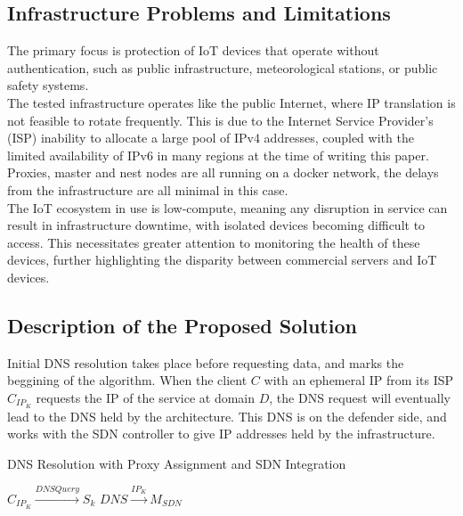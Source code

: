\documentclass[conference]{IEEEtran}
\begin{document}
\subsection{Infrastructure Problems and Limitations}
The primary focus is protection of IoT devices that operate without authentication, such as public infrastructure, meteorological stations, or public safety systems.
\\
The tested infrastructure operates like the public Internet, where IP translation is not feasible to rotate frequently. This is due to the Internet Service Provider's (ISP) inability to allocate a large pool of IPv4 addresses, coupled with the limited availability of IPv6 in many regions at the time of writing this paper. Proxies, master and nest nodes are all running on a docker network, the delays from the infrastructure are all minimal in this case.
\\
The IoT ecosystem in use is low-compute, meaning any disruption in service can result in infrastructure downtime, with isolated devices becoming difficult to access. This necessitates greater attention to monitoring the health of these devices, further highlighting the disparity between commercial servers and IoT devices.


\subsection{Description of the Proposed Solution}

Initial DNS resolution takes place before requesting data, and marks the beggining of the algorithm. When the client $C$ with an ephemeral IP from its ISP $C_{IP_K}$ requests the IP of the service at domain $D$, the DNS request will eventually lead to the DNS held by the architecture. This DNS is on the defender side, and works with the SDN controller to give IP addresses held by the infrastructure. \\

\begin{algorithm}
\caption{DNS Resolution with Proxy Assignment and SDN Integration}
\label{alg:dns-resolution}
\SetAlgoLined
{}
\vspace{6pt}
$C_{IP_K} \xrightarrow{DNS Query} S_k$\;
\vspace{2pt}
$DNS \xrightarrow{IP_K} M_{SDN}$\;
\vspace{2pt}
\end{algorithm}
\end{document}
